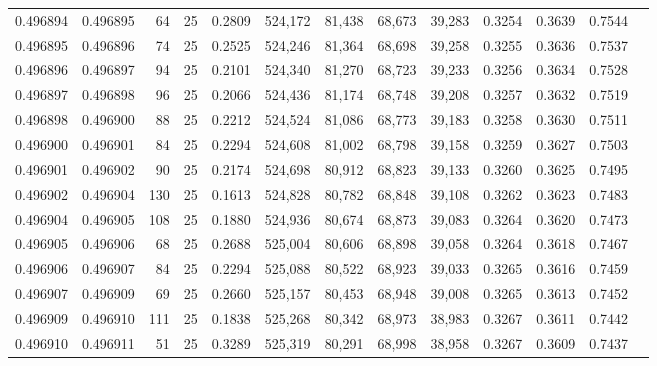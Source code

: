 \begin{tabular}{rrrrrrrrrrrrr}
0.496894 & 0.496895 &    64 &  25 &                                     0.2809 & 524,172 &  81,438 &  68,673 &  39,283 & 0.3254 & 0.3639 & 0.7544 \\
0.496895 & 0.496896 &    74 &  25 &                                     0.2525 & 524,246 &  81,364 &  68,698 &  39,258 & 0.3255 & 0.3636 & 0.7537 \\
0.496896 & 0.496897 &    94 &  25 &                                     0.2101 & 524,340 &  81,270 &  68,723 &  39,233 & 0.3256 & 0.3634 & 0.7528 \\
0.496897 & 0.496898 &    96 &  25 &                                     0.2066 & 524,436 &  81,174 &  68,748 &  39,208 & 0.3257 & 0.3632 & 0.7519 \\
0.496898 & 0.496900 &    88 &  25 &                                     0.2212 & 524,524 &  81,086 &  68,773 &  39,183 & 0.3258 & 0.3630 & 0.7511 \\
0.496900 & 0.496901 &    84 &  25 &                                     0.2294 & 524,608 &  81,002 &  68,798 &  39,158 & 0.3259 & 0.3627 & 0.7503 \\
0.496901 & 0.496902 &    90 &  25 &                                     0.2174 & 524,698 &  80,912 &  68,823 &  39,133 & 0.3260 & 0.3625 & 0.7495 \\
0.496902 & 0.496904 &   130 &  25 &                                     0.1613 & 524,828 &  80,782 &  68,848 &  39,108 & 0.3262 & 0.3623 & 0.7483 \\
0.496904 & 0.496905 &   108 &  25 &                                     0.1880 & 524,936 &  80,674 &  68,873 &  39,083 & 0.3264 & 0.3620 & 0.7473 \\
0.496905 & 0.496906 &    68 &  25 &                                     0.2688 & 525,004 &  80,606 &  68,898 &  39,058 & 0.3264 & 0.3618 & 0.7467 \\
0.496906 & 0.496907 &    84 &  25 &                                     0.2294 & 525,088 &  80,522 &  68,923 &  39,033 & 0.3265 & 0.3616 & 0.7459 \\
0.496907 & 0.496909 &    69 &  25 &                                     0.2660 & 525,157 &  80,453 &  68,948 &  39,008 & 0.3265 & 0.3613 & 0.7452 \\
0.496909 & 0.496910 &   111 &  25 &                                     0.1838 & 525,268 &  80,342 &  68,973 &  38,983 & 0.3267 & 0.3611 & 0.7442 \\
0.496910 & 0.496911 &    51 &  25 &                                     0.3289 & 525,319 &  80,291 &  68,998 &  38,958 & 0.3267 & 0.3609 & 0.7437 \\

\end{tabular}

